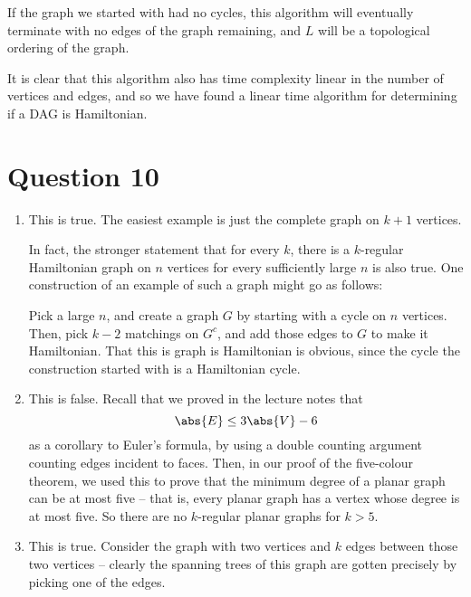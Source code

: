 \documentclass[nobib]{tufte-handout}
\begin{document}
If the graph we started with had no cycles, this algorithm will eventually terminate with no edges of the graph remaining, and $L$ will be a topological ordering of the graph.

It is clear that this algorithm also has time complexity linear in the number of vertices and edges, and so we have found a linear time algorithm for determining if a DAG is Hamiltonian.

\section{Question 10}

\begin{enumerate}[label=\alph*)]
    \item This is true. The easiest example is just the complete graph on $k+1$ vertices.
    
    In fact, the stronger statement that for every $k$, there is a $k$-regular Hamiltonian graph on $n$ vertices for every sufficiently large $n$ is also true. One construction of an example of such a graph might go as follows:
    
    Pick a large $n$, and create a graph $G$ by starting with a cycle on $n$ vertices. Then, pick $k-2$ matchings on $G^c$, and add those edges to $G$ to make it Hamiltonian. That this is graph is Hamiltonian is obvious, since the cycle the construction started with is a Hamiltonian cycle.

    \item This is false. Recall that we proved in the lecture notes that
    $$\abs{E} \leq 3\abs{V} - 6$$
    as a corollary to Euler's formula, by using a double counting argument counting edges incident to faces. Then, in our proof of the five-colour theorem, we used this to prove that the minimum degree of a planar graph can be at most five -- that is, every planar graph has a vertex whose degree is at most five. So there are no $k$-regular planar graphs for $k > 5$.

    \item This is true. Consider the graph with two vertices and $k$ edges between those two vertices -- clearly the spanning trees of this graph are gotten precisely by picking one of the edges.
    

\end{enumerate}
\end{document}
